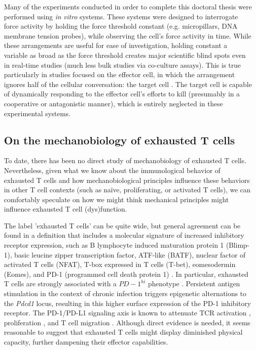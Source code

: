 Many of the experiments conducted in order to complete this doctoral thesis were performed using \textit{in vitro} systems. These systems were designed to interrogate force activity by holding the force threshold constant (e.g. micropillars, DNA membrane tension probes), while observing the cell's force activity in time. While these arrangements are useful for ease of investigation, holding constant a variable as broad as the force threshold creates major scientific blind spots even in real-time studies (much less bulk studies via co-culture assays). This is true particularly in studies focused on the effector cell, in which the arrangement ignores half of the cellular conversation: the target cell \cite{Tello-lafoz2021}. The target cell is capable of dynamically responding to the effector cell's efforts to kill (presumably in a cooperative or antagonistic manner), which is entirely neglected in these experimental systems. 

\subsection{On the mechanobiology of exhausted T cells}

To date, there has been no direct study of mechanobiology of exhausted T cells. Nevertheless, given what we know about the immunological behavior of exhausted T cells and how mechanobiological principles influence these behaviors in other T cell contexts (such as na{\"i}ve, proliferating, or activated T cells), we can comfortably speculate on how we might think mechanical principles might influence exhausted T cell (dys)function.

The label 'exhausted T cells' can be quite wide, but general agreement can be found in a definition that includes a molecular signature of increased inhibitory receptor expression, such as B lymphocyte induced maturation protein 1 (Blimp-1), basic leucine zipper transcription factor, ATF-like (BATF), nuclear factor of activated T cells (NFAT), T-box expressed in T cells (T-bet), eomesodermin (Eomes), and PD-1 (programmed cell death protein 1) \cite{Wherry2011, Quigley2010, Keir2008, Doering2012, Wherry2007, Wang2012,  Lazarevic2013, Rangachari2012, Shin2009, Paley2012, Larsson2013}. In particular, exhausted T cells are strongly associated with a $PD-1^{hi}$ phenotype \cite{Keir2008}. Persistent antigen stimulation in the context of chronic infection triggers epigenetic alternations to the \textit{Pdcd1} locus, resulting in this higher surface expression of the PD-1 inhibitory receptor. The PD-1/PD-L1 signaling axis is known to attenuate TCR activation \cite{Mizuno2019}, proliferation \cite{Schietinger2014}, and T cell migration \cite{Zinselmeyer2013}. Although direct evidence is needed, it seems reasonable to suggest that exhausted T cells might display diminished physical capacity, further dampening their effector capabilities.

